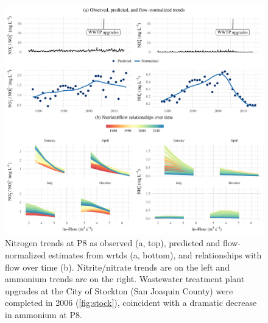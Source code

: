 \documentclass[journal = esthag, manuscript = article]{achemso}\usepackage[]{graphicx}\usepackage[]{color}
\begin{document}
\begin{figure}[!ht]

{\centering \includegraphics[width=\textwidth]{figs/p8trnds-1} 

}

\caption{Nitrogen trends at P8 as observed (a, top), predicted and flow-normalized estimates from \ac{wrtds} (a, bottom), and relationships with flow over time (b).  Nitrite/nitrate trends are on the left and ammonium trends are on the right.  Wastewater treatment plant upgrades at the City of Stockton (San Joaquin County) were completed in 2006 (\cref{fig:stock}), coincident with a dramatic decrease in ammonium at P8.}\label{fig:p8trnds}
\end{figure}
\end{document}
